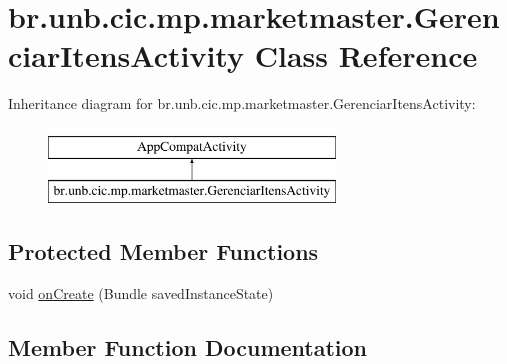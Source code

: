 \hypertarget{classbr_1_1unb_1_1cic_1_1mp_1_1marketmaster_1_1GerenciarItensActivity}{}\section{br.\+unb.\+cic.\+mp.\+marketmaster.\+Gerenciar\+Itens\+Activity Class Reference}
\label{classbr_1_1unb_1_1cic_1_1mp_1_1marketmaster_1_1GerenciarItensActivity}
Inheritance diagram for br.\+unb.\+cic.\+mp.\+marketmaster.\+Gerenciar\+Itens\+Activity\+:\begin{figure}[H]
\begin{center}
\leavevmode
\includegraphics[height=2.000000cm]{classbr_1_1unb_1_1cic_1_1mp_1_1marketmaster_1_1GerenciarItensActivity}
\end{center}
\end{figure}
\subsection*{Protected Member Functions}
\begin{DoxyCompactItemize}
\item 
void \mbox{\hyperlink{classbr_1_1unb_1_1cic_1_1mp_1_1marketmaster_1_1GerenciarItensActivity_a76d820e5c4d8c55d293f41089d7ac17a}{on\+Create}} (Bundle saved\+Instance\+State)
\end{DoxyCompactItemize}


\subsection{Member Function Documentation}
\mbox{\label{classbr_1_1unb_1_1cic_1_1mp_1_1marketmaster_1_1GerenciarItensActivity_a76d820e5c4d8c55d293f41089d7ac17a}} 
